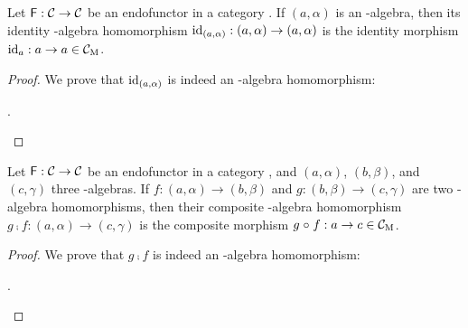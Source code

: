 \begin{definition}%
  \label{def:identity-algebra-homomorphism}

  Let $\mathsf{F}: \mathcal{C} \to \mathcal{C}$ be an endofunctor in a category
  . If $(a,\alpha)$ is an -algebra, then its identity
  -algebra homomorphism $\operatorname{id}_{(a,\alpha)}: (a,\alpha) \to
  (a,\alpha)$ is the identity morphism $\operatorname{id}_{a}: a \to a \in
  \mathcal{C}_{\operatorname{M}}$.

  \begin{proof}

    We prove that $\operatorname{id}_{(a,\alpha)}$ is indeed an -algebra
    homomorphism:
    \begin{steps}
        \eqby{\eqref{eq:functor-identity}}
      .
    \end{steps}

  \end{proof}

\end{definition}

\begin{definition}%
  \label{def:composite-algebra-homomorphism}

  Let $\mathsf{F}: \mathcal{C} \to \mathcal{C}$ be an endofunctor in a category
  , and $(a,\alpha)$, $(b,\beta)$, and $(c,\gamma)$ three
  -algebras. If $f: (a,\alpha) \to (b,\beta)$ and $g:
  (b,\beta) \to (c,\gamma)$ are two -algebra homomorphisms,
  then their composite -algebra homomorphism $g \comp f:
  (a,\alpha) \to (c,\gamma)$ is the composite morphism $g \mathrel{\circ} f: a
  \to c \in \mathcal{C}_{\operatorname{M}}$.

  \begin{proof}

    We prove that $g \comp f$ is indeed an -algebra
    homomorphism:
    \begin{steps}
        \eqby{\eqref{eq:functor-composition}}
        \eqby{\eqref{eq:algebra-homomorphism}}
      .
    \end{steps}

  \end{proof}

\end{definition}

